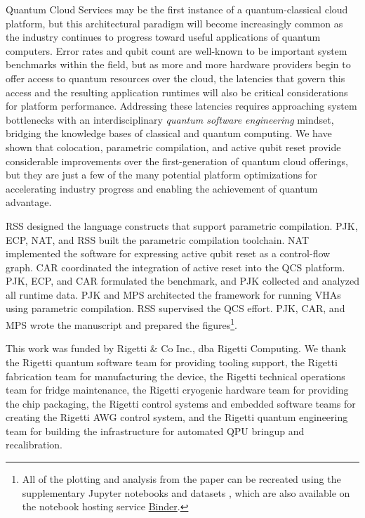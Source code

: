\documentclass[12pt]{iopart}
\begin{document}
Quantum Cloud Services may be the first instance of a quantum-classical cloud platform, but this architectural paradigm will become increasingly common as the industry continues to progress toward useful applications of quantum computers. Error rates and qubit count are well-known to be important system benchmarks within the field, but as more and more hardware providers begin to offer access to quantum resources over the cloud, the latencies that govern this access and the resulting application runtimes will also be critical considerations for platform performance. Addressing these latencies requires approaching system bottlenecks with an interdisciplinary \textit{quantum software engineering} mindset, bridging the knowledge bases of classical and quantum computing. We have shown that colocation, parametric compilation, and active qubit reset provide considerable improvements over the first-generation of quantum cloud offerings, but they are just a few of the many potential platform optimizations for accelerating industry progress and enabling the achievement of quantum advantage.

\ack

RSS designed the language constructs that support parametric compilation. PJK, ECP, NAT, and RSS built the parametric compilation toolchain. NAT implemented the software for expressing active qubit reset as a control-flow graph. CAR coordinated the integration of active reset into the QCS platform. PJK, ECP, and CAR formulated the benchmark, and PJK collected and analyzed all runtime data. PJK and MPS architected the framework for running VHAs using parametric compilation. RSS supervised the QCS effort. PJK, CAR, and MPS wrote the manuscript and prepared the figures\footnote{All of the plotting and analysis from the paper can be recreated using the supplementary Jupyter notebooks and datasets \cite{QCSPaperSupplement}, which are also available on the notebook hosting service \href{https://mybinder.org/v2/gh/rigetti/qcs-paper/master?urlpath=lab/tree/Welcome.ipynb}{Binder}.}.

This work was funded by Rigetti \& Co Inc., dba Rigetti Computing. We thank the Rigetti quantum software team for providing tooling support, the Rigetti fabrication team for manufacturing the device, the Rigetti technical operations team for fridge maintenance, the Rigetti cryogenic hardware team for providing the chip packaging, the Rigetti control systems and embedded software teams for creating the Rigetti AWG control system, and the Rigetti quantum engineering team for building the infrastructure for automated QPU bringup and recalibration.
\end{document}
